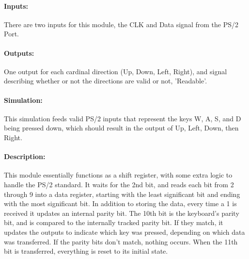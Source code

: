 \documentclass[]{article}
\begin{document}
\paragraph{Inputs:} There are two inputs for this module, the CLK and Data signal from the PS/2 Port.
\paragraph{Outputs:} One output for each cardinal direction (Up, Down, Left, Right), and signal describing whether or not the directions are valid or not, 'Readable'.
\paragraph{Simulation:} This simulation feeds valid PS/2 inputs that represent the keys W, A, S, and D being pressed down, which should result in the output of Up, Left, Down, then Right.
\paragraph{Description:} This module essentially functions as a shift register, with some extra logic to handle the PS/2 standard.
It waits for the 2nd bit, and reads each bit from 2 through 9 into a data register, starting with the least significant bit and ending with the most significant bit.
In addition to storing the data, every time a 1 is received it updates an internal parity bit.
The 10th bit is the keyboard's parity bit, and is compared to the internally tracked parity bit.
If they match, it updates the outputs to indicate which key was pressed, depending on which data was transferred.
If the parity bits don't match, nothing occurs.
When the 11th bit is transferred, everything is reset to its initial state.
\end{document}
